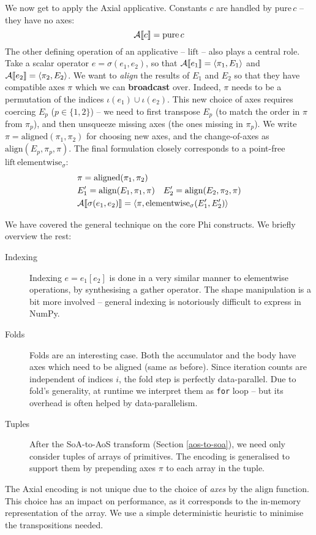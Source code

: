 We now get to apply the Axial applicative. Constants $c$ are handled by $\mathrm{pure}\,c$ -- they have no axes:
$$ \mathcal A \denot{c} = \mathrm{pure}\,c $$
The other defining operation of an applicative -- $\mathrm{lift}$ -- also plays a central role. 
Take a scalar operator $e = \sigma(e_1, e_2)$, so that $\mathcal A \denot{e_1} = \phipair{\pi_{1}}{E_1}$ and $\mathcal A \denot{e_2} = \phipair{\pi_{2}}{E_2}$. 
We want to \textit{align} the results of $E_1$ and $E_2$ so that they have compatible axes $\pi$ which we can \textbf{broadcast} over. 
Indeed, $\pi$ needs to be a permutation of the indices $\iota(e_1) \cup \iota(e_2)$. 
This new choice of axes requires coercing $E_p$ ($p \in \{1, 2\}$) -- we need to first transpose $E_p$ (to match the order in $\pi$ from $\pi_{p}$), and then unsqueeze missing axes (the ones missing in $\pi_{p}$). 
We write $\pi = \mathrm{aligned}(\pi_{1}, \pi_{2})$ for choosing new axes, and the change-of-axes as $\mathrm{align}(E_p, \pi_{p}, \pi)$. The final formulation closely corresponds to a point-free $\mathrm{lift}\,\mathrm{elementwise}_\sigma$:
\begin{align*}
\begin{split}
&\pi = \mathrm{aligned}(\pi_{1}, \pi_{2}) \\
&E_1' = \mathrm{align}(E_1, \pi_{1}, \pi) \quad E_2' = \mathrm{align}(E_2, \pi_{2}, \pi) \\
&\mathcal A \denot{\sigma(e_1, e_2)} = \left\langle \pi, \mathrm{elementwise}_{\sigma}(E_1', E_2') \right\rangle 
\end{split}
\end{align*}

We have covered the general technique on the core Phi constructs. We briefly overview the rest:
\begin{description}
    \item[Indexing] Indexing $e = e_1[e_2]$ is done in a very similar manner to elementwise operations, by synthesising a $\mathrm{gather}$ operator. The shape manipulation is a bit more involved -- general indexing is notoriously difficult to express in NumPy.
    \item[Folds] Folds are an interesting case. Both the accumulator and the body have axes which need to be aligned (same as before). Since iteration counts are independent of indices $i$, the fold step is perfectly data-parallel. Due to fold's generality, at runtime we interpret them as \texttt{for} loop -- but its overhead is often helped by data-parallelism.
    \item[Tuples] After the SoA-to-AoS transform (Section \ref{aos-to-soa}), we need only consider tuples of arrays of primitives. The encoding is generalised to support them by prepending axes $\pi$ to each array in the tuple.  
\end{description}
The Axial encoding is not unique due to the choice of \textit{axes} by the $\mathrm{align}$ function. This choice has an impact on performance, as it corresponds to the in-memory representation of the array. We use a simple deterministic heuristic to minimise the transpositions needed. 

